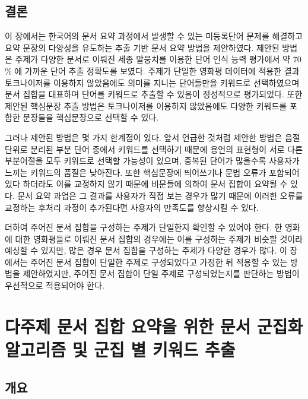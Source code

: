 \documentclass[oneside, ko,phd]{snuthesis_utf8_kor}
\begin{document}
\section{결론}

이 장에서는 한국어의 문서 요약 과정에서 발생할 수 있는 미등록단어 문제를 해결하고 요약 문장의 다양성을 유도하는 추출 기반 문서 요약 방법을 제안하였다.
제안된 방법은 주제가 다양한 문서로 이뤄진 세종 말뭉치를 이용한 단어 인식 능력 평가에서 약 70 \% 에 가까운 단어 추출 정확도를 보였다.
주제가 단일한 영화평 데이터에 적용한 결과 토크나이저를 이용하지 않았음에도 의미를 지니는 단어들만을 키워드로 선택하였으며 문서 집합을 대표하며 단어를 키워드로 추출할 수 있음이 정성적으로 평가되었다.
또한 제안된 핵심문장 추출 방법은 토크나이저를 이용하지 않았음에도 다양한 키워드를 포함한 문장들을 핵심문장으로 선택할 수 있다.

그러나 제안된 방법은 몇 가지 한계점이 있다.
앞서 언급한 것처럼 제안한 방법은 음절 단위로 분리된 부분 단어 중에서 키워드를 선택하기 때문에 용언의 표현형이 서로 다른 부분어절을 모두 키워드로 선택할 가능성이 있으며, 중복된 단어가 많을수록 사용자가 느끼는 키워드의 품질은 낮아진다.
또한 핵심문장에 띄어쓰기나 문법 오류가 포함되어 있다 하더라도 이를 교정하지 않기 때문에 비문들에 의하여 문서 집합이 요약될 수 있다.
문서 요약 과업은 그 결과를 사용자가 직접 보는 경우가 많기 때문에 이러한 오류를 교정하는 후처리 과정이 추가된다면 사용자의 만족도를 향상시킬 수 있다.

더하여 주어진 문서 집합을 구성하는 주제가 단일한지 확인할 수 있어야 한다.
한 영화에 대한 영화평들로 이뤄진 문서 집합의 경우에는 이를 구성하는 주제가 비슷할 것이라 예상할 수 있지만, 많은 경우 문서 집합을 구성하는 주제가 다양한 경우가 많다.
이 장에서는 주어진 문서 집합이 단일한 주제로 구성되었다고 가정한 뒤 적용할 수 있는 방법을 제안하였지만, 주어진 문서 집합이 단일 주제로 구성되었는지를 판단하는 방법이 우선적으로 적용되어야 한다.

\newpage
\chapter{다주제 문서 집합 요약을 위한 문서 군집화 알고리즘 및 군집 별 키워드 추출} \label{improved_kmeans}

\section{개요}
\end{document}
